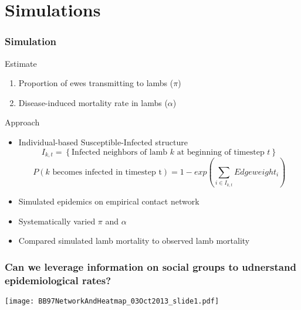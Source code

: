 \documentclass[fleqn,xcolor=table]{beamer}
\begin{document}
\section{Simulations}
\begin{frame}[t]
	\frametitle{\color{darkred} Simulation}
\footnotesize \color{navy}Estimate
\begin{enumerate}
	\item{\footnotesize \color{navy}Proportion of ewes transmitting to
		lambs ($\pi$)}
	\item{\footnotesize \color{navy}Disease-induced mortality rate in lambs
		($\alpha$)} 
\end{enumerate}

\vspace{.2in}
{\color{navy} Approach}
{\footnotesize
	\begin{itemize}
		\item \scriptsize \color{navy}Individual-based 
			\color{red}S\color{navy}usceptible-\color{red}I\color{navy}nfected structure
			\[I_{k, t} = \left\{\text{Infected neighbors
			of lamb }k \text{ at beginning of timestep }
	t\right\}\] \[P(k \text{ becomes infected in timestep t}) = 1-exp\left(\sum_{i \in
			I_{k, t}}Edgeweight_i\right)\]
		\item \scriptsize \color{navy}Simulated epidemics on empirical contact network
		\item \scriptsize \color{navy}Systematically varied $\pi$ and $\alpha$
		\item \scriptsize \color{navy}Compared simulated lamb mortality
			to observed lamb mortality
%		
	\end{itemize}
}
\end{frame}

\begin{frame}
\frametitle{\color{darkred} Can we leverage information on social groups to
udnerstand epidemiological rates?}
\vspace{.1in}

\begin{center}
\texttt{[image: BB97NetworkAndHeatmap\_03Oct2013\_slide1.pdf]}
\end{center}

\end{frame}
\end{document}
